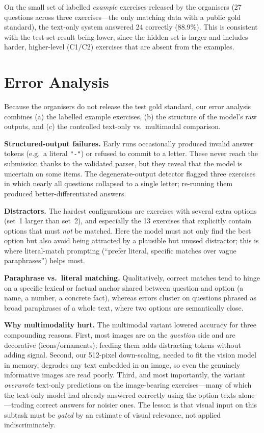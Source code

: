 \documentclass{ceurart}   %
\begin{document}
On the small set of labelled \emph{example} exercises released by the
organisers (27 questions across three exercises---the only matching data
with a public gold standard), the text-only system answered 24 correctly
(88.9\%).
This is consistent with the test-set result being lower, since the hidden
set is larger and includes harder, higher-level (C1/C2) exercises that are
absent from the examples.

\section{Error Analysis}
\label{sec:errors}
Because the organisers do not release the test gold standard, our error
analysis combines (a) the labelled example exercises, (b) the structure of
the model's raw outputs, and (c) the controlled text-only vs.\ multimodal
comparison.

\textbf{Structured-output failures.} Early runs occasionally produced
invalid answer tokens (e.g.\ a literal \texttt{"-"}) or refused to commit to
a letter. These never reach the submission thanks to the validated parser,
but they reveal that the model is uncertain on some items. The
degenerate-output detector flagged three exercises in which nearly all
questions collapsed to a single letter; re-running them produced
better-differentiated answers.

\textbf{Distractors.} The hardest configurations are exercises with several
extra options (set~1 larger than set~2), and especially the 13 exercises
that explicitly contain options that must \emph{not} be matched. Here the
model must not only find the best option but also avoid being attracted by a
plausible but unused distractor; this is where literal-match prompting
(``prefer literal, specific matches over vague paraphrases'') helps most.

\textbf{Paraphrase vs.\ literal matching.} Qualitatively, correct matches
tend to hinge on a specific lexical or factual anchor shared between question
and option (a name, a number, a concrete fact), whereas errors cluster on
questions phrased as broad paraphrases of a whole text, where two options are
semantically close.

\textbf{Why multimodality hurt.} The multimodal variant lowered accuracy for
three compounding reasons. First, most images are on the \emph{question} side
and are decorative (icons/ornaments); feeding them adds distracting tokens
without adding signal. Second, our 512-pixel down-scaling, needed to fit the
vision model in memory, degrades any text embedded in an image, so even the
genuinely informative images are read poorly. Third, and most importantly,
the variant \emph{overwrote} text-only predictions on the image-bearing
exercises---many of which the text-only model had already answered correctly
using the option texts alone---trading correct answers for noisier ones. The
lesson is that visual input on this subtask must be \emph{gated} by an
estimate of visual relevance, not applied indiscriminately.
\end{document}
